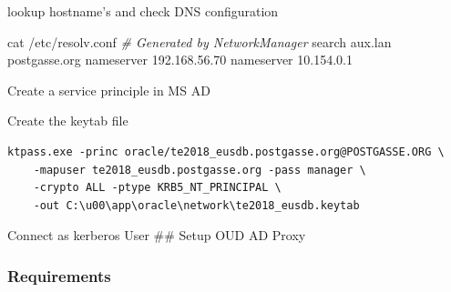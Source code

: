 \documentclass[a4paper,,tablecaptionabove]{scrartcl}
\newenvironment{Shaded}{}{}
\newcommand{\CommentTok}[1]{\textcolor[rgb]{0.38,0.63,0.69}{\textit{#1}}}
\newcommand{\ExtensionTok}[1]{#1}
\newcommand{\FunctionTok}[1]{\textcolor[rgb]{0.02,0.16,0.49}{#1}}
\newcommand{\NormalTok}[1]{#1}
\begin{document}
lookup hostname's and check DNS configuration

\begin{Shaded}
\begin{Highlighting}[]
\FunctionTok{cat}\NormalTok{ /etc/resolv.conf}
\CommentTok{# Generated by NetworkManager}
\ExtensionTok{search}\NormalTok{ aux.lan postgasse.org}
\ExtensionTok{nameserver}\NormalTok{ 192.168.56.70}
\ExtensionTok{nameserver}\NormalTok{ 10.154.0.1}
\end{Highlighting}
\end{Shaded}

\begin{Shaded}
\end{Shaded}

\begin{Shaded}
\end{Shaded}

Create a service principle in MS AD

Create the keytab file

\begin{verbatim}
ktpass.exe -princ oracle/te2018_eusdb.postgasse.org@POSTGASSE.ORG \
    -mapuser te2018_eusdb.postgasse.org -pass manager \
    -crypto ALL -ptype KRB5_NT_PRINCIPAL \
    -out C:\u00\app\oracle\network\te2018_eusdb.keytab
\end{verbatim}

Connect as kerberos User \#\# Setup OUD AD Proxy

\hypertarget{requirements}{%
\subsubsection{Requirements}\label{requirements}}
\end{document}
